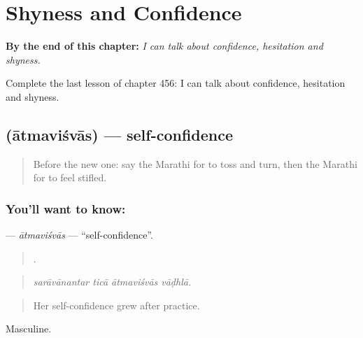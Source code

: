 
\chapter{Shyness and Confidence}
\label{ch:mr-shyness-and-confidence}

\begin{chapteropening}
\textbf{By the end of this chapter:} \emph{I can talk about confidence, hesitation and shyness.}

Complete the last lesson of chapter 456: I can talk about confidence, hesitation and shyness.
\end{chapteropening}

\section[\texorpdfstring{\mr{आत्मविश्वास} (ātmaviśvās)}{आत्मविश्वास (ātmaviśvās)}]{ (ātmaviśvās) — self-confidence}

\label{lesson:MR-C456-atmavisvas}



\begin{quote}
Before the new one: say the Marathi for to toss and turn, then the Marathi for to feel stifled.
\end{quote}

\subsection*{You'll want to know: }
\textbf{} — \emph{ātmaviśvās} — \textquotedblleft{}self-confidence\textquotedblright{}.

\begin{quote}
   .
\end{quote}

\begin{quote}
\emph{sarāvānantar ticā ātmaviśvās vāḍhlā.}
\end{quote}

\begin{quote}
Her self-confidence grew after practice.
\end{quote}

Masculine.

